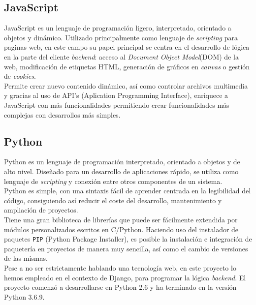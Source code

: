 \documentclass[a4paper, 12pt]{book}
\begin{document}
	\subsection{JavaScript}
	\label{subsec:javascript}
		JavaScript \cite{JavaScript} es un lenguaje de programación ligero, interpretado, orientado a objetos y dinámico. Utilizado principalmente como lenguaje de \textit{scripting} para paginas web, en este campo su papel principal se centra en el desarrollo de lógica en la parte del cliente \textit{backend}: acceso al \textit{Document Object Model}(DOM) de la web, modificación de etiquetas HTML, generación de gráficos en \textit{canvas} o gestión de \textit{cookies}. \\
		
		Permite crear nuevo contenido dinámico, así como controlar archivos multimedia y gracias al uso de API's (Aplication Programming Interface), enriquece a JavaScript con más funcionalidades permitiendo crear funcionalidades más complejas con desarrollos más simples.
		
	\subsection{Python}
	\label{subsec:python}
		Python es un lenguaje de programación interpretado, orientado a objetos y de alto nivel. Diseñado para un desarrollo de aplicaciones rápido, se utiliza como lenguaje de \textit{scripting} y conexión entre otros componentes de un sistema.\\
		
		Python es simple, con una sintaxis fácil de aprender centrada en la legibilidad del código, consiguiendo así reducir el coste del desarrollo, mantenimiento y ampliación de proyectos.\\
		
		Tiene una gran biblioteca de librerías que puede ser fácilmente extendida por módulos personalizados escritos en C/Python. Haciendo uso del instalador de paquetes \texttt{PIP} (Python Package Installer), es posible la instalación e integración de paquetería en proyectos de manera muy sencilla, así como el cambio de versiones de las mismas.\\
		
		Pese a no ser estrictamente hablando una tecnología web, en este proyecto lo hemos empleado en el contexto de Django, para programar la lógica \textit{backend}. El proyecto comenzó a desarrollarse en Python 2.6 y ha terminado en la versión Python 3.6.9.
		
\end{document}
